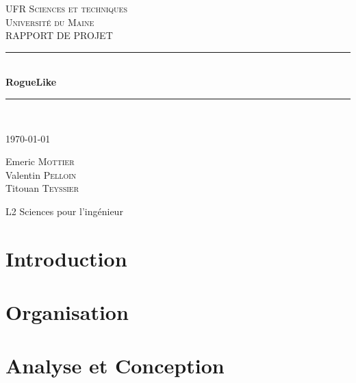 \documentclass[12pt]{report}
\begin{document}
\begin{titlepage}
	
	\newcommand{\HRule}{\rule{\linewidth}{0.5mm}}
	\center
	
	\vspace*{30pt}
	
	\textsc{\Large UFR Sciences et techniques\\ Université du Maine}\\[1.5cm]
	
	\Large RAPPORT DE PROJET\\[1.5cm]
	

	\vspace*{\fill}
	
	\HRule \\[0.4cm]
	{ \huge \bfseries RogueLike}\\
	\HRule \\[1.5cm]
	 
	 
	 \vspace{12pt}
	 
	{\large \today}\\[1cm]
	
	\vspace{12pt}
	
	\Large 
	
		Emeric \textsc{Mottier}\\
		Valentin \textsc{Pelloin}\\
		Titouan \textsc{Teyssier}\\
	
		\vspace{12pt}
		
		L2 Sciences pour l'ingénieur
		
	\vspace*{\fill}
	
\end{titlepage}

\tableofcontents

\chapter{Introduction}

\chapter{Organisation}

\chapter{Analyse et Conception}
\end{document}
